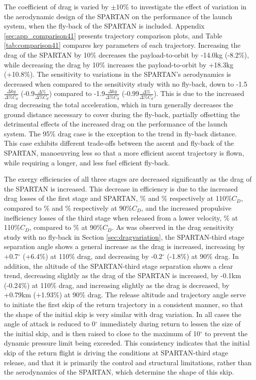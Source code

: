 The coefficient of drag is varied by $\pm$10\% to investigate the effect of variation in the aerodynamic design of the SPARTAN on the performance of the launch system, when the fly-back of the SPARTAN is included. Appendix \ref{sec:app_comparison41} presents trajectory comparison plots, and Table \ref{tab:comparison41} compares key parameters of each trajectory. 
Increasing the drag of the SPARTAN by 10\% decreases the payload-to-orbit by -14.0kg (-8.2\%), while decreasing the drag by 10\% increases the payload-to-orbit by +18.3kg (+10.8\%). 
The sensitivity to variations in the SPARTAN's aerodynamics is decreased when compared to the sensitivity study with no fly-back, down to -1.5 $\frac{\Delta kg}{\Delta\% C_{d}}$ (-0.9$\frac{\Delta \%}{\Delta\% C_{d}}$) compared to -1.9$\frac{\Delta kg}{\Delta\% C_{d}}$  (-0.99$\frac{\Delta \%}{\Delta\% C_{d}}$). 
This is due to the increased drag decreasing the total acceleration, which in turn generally decreases the ground distance necessary to cover during the fly-back, partially offsetting the detrimental effects of the increased drag on the performance of the launch system. The 95\% drag case is the exception to the trend in fly-back distance. This case exhibits different trade-offs between the ascent and fly-back of the SPARTAN, manoeuvring less so that a more efficient ascent trajectory is flown, while requiring a longer, and less fuel efficient fly-back. 

The exergy efficiencies of all three stages are decreased significantly as the drag of the SPARTAN is increased. This decrease in efficiency is due to the increased drag losses of the first stage and SPARTAN, \WDoneCdOneHundredTen\% and \WDsecondCdOneHundredTen\% respectively at 110\%$C_D$, compared to \WDoneCdNinety\% and \WDsecondCdNinety\% respectively at 90\%$C_D$, and the increased propulsive inefficiency losses of the third stage when released from a lower velocity, \PlossthreeCombinedCdOneHundredTen\% at 110\%$C_D$, compared to \PlossthreeCombinedCdNinety \% at 90\%$C_D$.
As was observed in the drag sensitivity study with no fly-back in Section \ref{sec:dragvariation}, the SPARTAN-third stage separation angle shows a general increase as the drag is increased, increasing by +0.7$^\circ$ (+6.4\%) at 110\% drag, and decreasing by -0.2$^\circ$ (-1.8\%) at 90\% drag. In addition, the altitude of the SPARTAN-third stage separation shows a clear trend, decreasing slightly as the drag of the SPARTAN is increased, by -0.1km (-0.24\%) at 110\% drag, and increasing slightly as the drag is decreased, by +0.79km (+1.93\%) at 90\% drag.  
The release altitude and trajectory angle serve to initiate the first skip of the return trajectory in a consistent manner, so that the shape of the initial skip is very similar with drag variation. In all cases the angle of attack is reduced to 0$^\circ$ immediately during return to lessen the size of the initial skip, and is then raised to close to the maximum of 10$^\circ$ to prevent the dynamic pressure limit being exceeded. This consistency indicates that the initial skip of the return flight is driving the conditions at SPARTAN-third stage release, and that it is primarily the control and structural limitations, rather than the aerodynamics of the SPARTAN, which determine the shape of this skip. 


